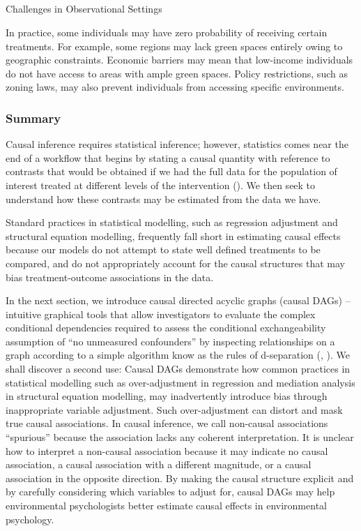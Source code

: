 \documentclass[
  singlecolumn]{article}
\makeatletter
\let\oldsubparagraph\subparagraph
\renewcommand{\subparagraph}{
    \@ifstar
      \xxxSubParagraphStar
      \xxxSubParagraphNoStar
  }
\newcommand{\xxxSubParagraphStar}[1]{\oldsubparagraph*{#1}\mbox{}}
\newcommand{\xxxSubParagraphNoStar}[1]{\oldsubparagraph{#1}\mbox{}}
\makeatother
\begin{document}
\subparagraph{Challenges in Observational
Settings}\label{challenges-in-observational-settings-2}

In practice, some individuals may have zero probability of receiving
certain treatments. For example, some regions may lack green spaces
entirely owing to geographic constraints. Economic barriers may mean
that low-income individuals do not have access to areas with ample green
spaces. Policy restrictions, such as zoning laws, may also prevent
individuals from accessing specific environments.

\subsubsection{Summary}\label{summary}

Causal inference requires statistical inference; however, statistics
comes near the end of a workflow that begins by stating a causal
quantity with reference to contrasts that would be obtained if we had
the full data for the population of interest treated at different levels
of the intervention (). We then seek to understand how these contrasts may be estimated
from the data we have.

Standard practices in statistical modelling, such as regression
adjustment and structural equation modelling, frequently fall short in
estimating causal effects because our models do not attempt to state
well defined treatments to be compared, and do not appropriately account
for the causal structures that may bias treatment-outcome associations
in the data.

In the next section, we introduce causal directed acyclic graphs (causal
DAGs) -- intuitive graphical tools that allow investigators to evaluate
the complex conditional dependencies required to assess the conditional
exchangeability assumption of ``no unmeasured confounders'' by
inspecting relationships on a graph according to a simple algorithm know
as the rules of d-separation (,
). We shall discover a second use:
Causal DAGs demonstrate how common practices in statistical modelling
such as over-adjustment in regression and mediation analysis in
structural equation modelling, may inadvertently introduce bias through
inappropriate variable adjustment. Such over-adjustment can distort and
mask true causal associations. In causal inference, we call non-causal
associations ``spurious'' because the association lacks any coherent
interpretation. It is unclear how to interpret a non-causal association
because it may indicate no causal association, a causal association with
a different magnitude, or a causal association in the opposite
direction. By making the causal structure explicit and by carefully
considering which variables to adjust for, causal DAGs may help
environmental psychologists better estimate causal effects in
environmental psychology.
\end{document}
